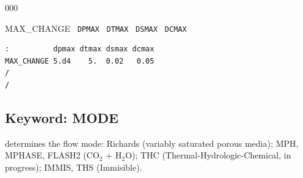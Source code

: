 \documentclass[12pt]{article}
\begin{document}

\begin{deflist}{000}
\item[MAX\_CHANGE] \ {\tt DPMAX} \ {\tt DTMAX} \ {\tt DSMAX} \ {\tt DCMAX}
\end{deflist}


\begin{verbatim}
:          dpmax dtmax dsmax dcmax
MAX_CHANGE 5.d4    5.  0.02   0.05
/
/
\end{verbatim}


\newpage
\protect\hypertarget{target_mode}{}

\subsection{Keyword: MODE}

 determines the flow mode: Richards (variably saturated porous media); MPH, MPHASE, FLASH2 (CO$_2$ + H$_2$O); THC (Thermal-Hydrologic-Chemical, in pro\-gress); IMMIS, THS (Immisible).

\end{document}
